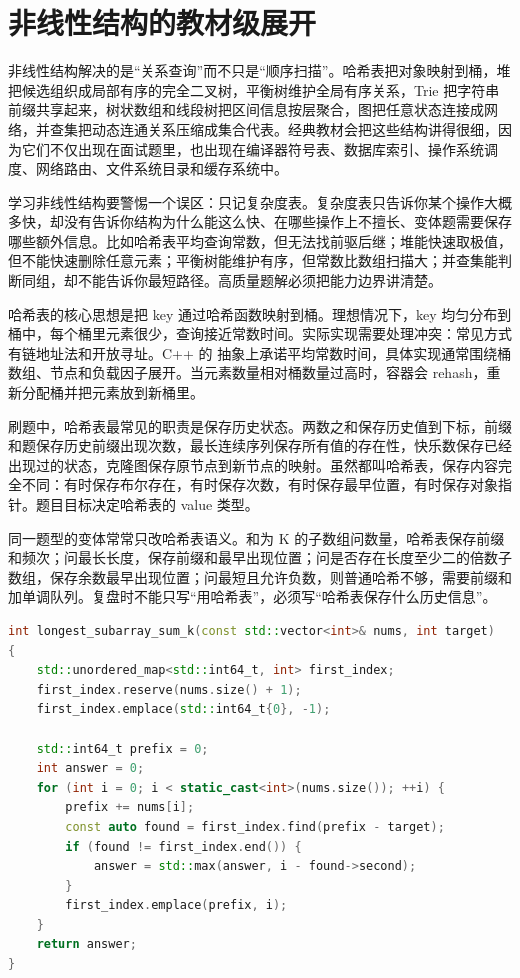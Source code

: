 \section{非线性结构的教材级展开}

非线性结构解决的是“关系查询”而不只是“顺序扫描”。哈希表把对象映射到桶，堆把候选组织成局部有序的完全二叉树，平衡树维护全局有序关系，Trie 把字符串前缀共享起来，树状数组和线段树把区间信息按层聚合，图把任意状态连接成网络，并查集把动态连通关系压缩成集合代表。经典教材会把这些结构讲得很细，因为它们不仅出现在面试题里，也出现在编译器符号表、数据库索引、操作系统调度、网络路由、文件系统目录和缓存系统中。

学习非线性结构要警惕一个误区：只记复杂度表。复杂度表只告诉你某个操作大概多快，却没有告诉你结构为什么能这么快、在哪些操作上不擅长、变体题需要保存哪些额外信息。比如哈希表平均查询常数，但无法找前驱后继；堆能快速取极值，但不能快速删除任意元素；平衡树能维护有序，但常数比数组扫描大；并查集能判断同组，却不能告诉你最短路径。高质量题解必须把能力边界讲清楚。


哈希表的核心思想是把 key 通过哈希函数映射到桶。理想情况下，key 均匀分布到桶中，每个桶里元素很少，查询接近常数时间。实际实现需要处理冲突：常见方式有链地址法和开放寻址。C++ 的  抽象上承诺平均常数时间，具体实现通常围绕桶数组、节点和负载因子展开。当元素数量相对桶数量过高时，容器会 rehash，重新分配桶并把元素放到新桶里。

刷题中，哈希表最常见的职责是保存历史状态。两数之和保存历史值到下标，前缀和题保存历史前缀出现次数，最长连续序列保存所有值的存在性，快乐数保存已经出现过的状态，克隆图保存原节点到新节点的映射。虽然都叫哈希表，保存内容完全不同：有时保存布尔存在，有时保存次数，有时保存最早位置，有时保存对象指针。题目目标决定哈希表的 value 类型。

同一题型的变体常常只改哈希表语义。和为 K 的子数组问数量，哈希表保存前缀和频次；问最长长度，保存前缀和最早出现位置；问是否存在长度至少二的倍数子数组，保存余数最早出现位置；问最短且允许负数，则普通哈希不够，需要前缀和加单调队列。复盘时不能只写“用哈希表”，必须写“哈希表保存什么历史信息”。

\begin{lstlisting}[language=C++,caption={最长和为 K 的子数组：保存最早前缀位置}]
int longest_subarray_sum_k(const std::vector<int>& nums, int target)
{
    std::unordered_map<std::int64_t, int> first_index;
    first_index.reserve(nums.size() + 1);
    first_index.emplace(std::int64_t{0}, -1);

    std::int64_t prefix = 0;
    int answer = 0;
    for (int i = 0; i < static_cast<int>(nums.size()); ++i) {
        prefix += nums[i];
        const auto found = first_index.find(prefix - target);
        if (found != first_index.end()) {
            answer = std::max(answer, i - found->second);
        }
        first_index.emplace(prefix, i);
    }
    return answer;
}
\end{lstlisting}

